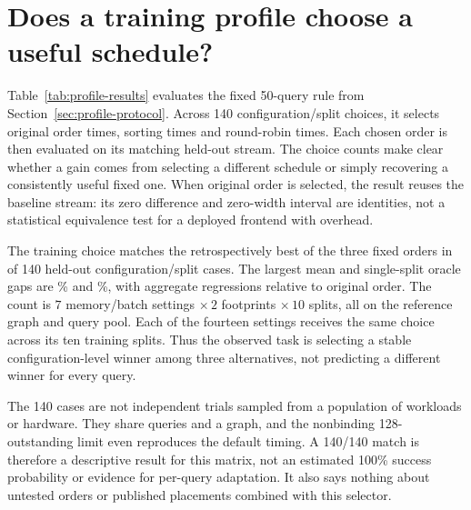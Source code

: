\section{Does a training profile choose a useful schedule?}
\label{sec:profile-results}
Table~\ref{tab:profile-results} evaluates the fixed 50-query rule from Section~\ref{sec:profile-protocol}. Across 140 configuration/split choices, it selects original order \ProfileOriginalChoices{} times, sorting \ProfileSortedChoices{} times and round-robin \ProfileRRChoices{} times. Each chosen order is then evaluated on its matching held-out stream. The choice counts make clear whether a gain comes from selecting a different schedule or simply recovering a consistently useful fixed one. When original order is selected, the result reuses the baseline stream: its zero difference and zero-width interval are identities, not a statistical equivalence test for a deployed frontend with overhead.

\begin{table}[htbp]\centering\small
\caption[Training-selected schedules on held-out queries]{BFS placement, 50 calibration queries and 200 held-out queries per split. O/S/R counts denote original/sorted/round-robin choices across ten splits. Differences from original order are means with paired 95\% intervals; the oracle gap is the mean excess over the best fixed order chosen retrospectively for each held-out split. Lower is better.}\label{tab:profile-results}
\resizebox{\textwidth}{!}{}
\end{table}

The training choice matches the retrospectively best of the three fixed orders in \ProfileOracleMatches{} of 140 held-out configuration/split cases. The largest mean and single-split oracle gaps are \ProfileMaxMeanRegret\% and \ProfileMaxSplitRegret\%, with \ProfileOriginalRegressions{} aggregate regressions relative to original order. The count is $7$ memory/batch settings $\times\,2$ footprints $\times\,10$ splits, all on the reference graph and query pool. Each of the fourteen settings receives the same choice across its ten training splits. Thus the observed task is selecting a stable configuration-level winner among three alternatives, not predicting a different winner for every query.

The 140 cases are not independent trials sampled from a population of workloads or hardware. They share queries and a graph, and the nonbinding 128-outstanding limit even reproduces the default timing. A 140/140 match is therefore a descriptive result for this matrix, not an estimated 100\% success probability or evidence for per-query adaptation. It also says nothing about untested orders or published placements combined with this selector.

